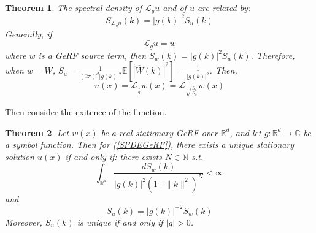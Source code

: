 \documentclass{article}
\newtheorem{theorem}{Theorem}
\begin{document}
\begin{theorem}
	The spectral density of $\mathcal{L}_gu$ and of $u$ are related by:
	\begin{equation}
		S_{\mathcal{L}_gu}(k) = \left|g(k)\right|^2S_u(k)
	\end{equation}
	Generally, if 
	\begin{equation}\label{SPDEGeRF}
		\mathcal{L}_gu = w
	\end{equation}
	where $w$ is a GeRF source term, then $S_w(k) = \left|g(k)\right|^2S_u(k)$.
	Therefore, when $w = W$, $S_u =\frac{1}{(2\pi)^{d}\left|g(k)\right|^2}\mathbb{E}[|\hat{W}(k)|^2]=\frac{1}{\left|g(k)\right|^2}$. 
  Then, 
\begin{equation}
	u(x) =\mathcal{L}_{\frac{1}{g}}w(x) = \mathcal{L}_{\sqrt{\frac{S_u}{S_w}}}w(x)
\end{equation}
\end{theorem}

Then consider the exitence of the function.
\begin{theorem}
	Let $w(x)$ be a real stationary GeRF over $\mathbb{R}^d$, and let $g:\mathbb{R}^d\rightarrow \mathbb{C}$ be a symbol function. 
	Then for (\ref{SPDEGeRF}), there exists a unique stationary solution $u(x)$ if and only if:
	there exists $N\in \mathbb{N}$ s.t. 
	\begin{equation}
		\int_{\mathbb{R}^d}\frac{dS_w(k)}{\left|g(k)\right|^2(1+\|k\|^2)^N} < \infty
	\end{equation}
	and 
	\begin{equation}
		S_u(k) = \left|g(k)\right|^{-2}S_w(k)
	\end{equation}
	Moreover, $S_u(k)$ is unique if and only if $\left|g\right|>0$.
\end{theorem}

\end{document}
